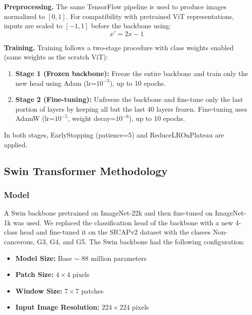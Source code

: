 \documentclass[conference]{IEEEtran}
\begin{document}
\textbf{Preprocessing.}
The same TensorFlow pipeline is used to produce images normalized to $[0,1]$. For compatibility with pretrained ViT representations, inputs are scaled to $[-1,1]$ before the backbone using:
\[
x' = 2x - 1
\]

\textbf{Training.}
Training follows a two-stage procedure with class weights enabled (same weights as the scratch ViT):
\begin{enumerate}
    \item \textbf{Stage 1 (Frozen backbone):} Freeze the entire backbone and train only the new head using Adam (lr=$10^{-3}$), up to 10 epochs.
    \item \textbf{Stage 2 (Fine-tuning):} Unfreeze the backbone and fine-tune only the last portion of layers by keeping all but the last 40 layers frozen. Fine-tuning uses AdamW (lr=$10^{-5}$, weight decay=$10^{-6}$), up to 10 epochs.
\end{enumerate}
In both stages, EarlyStopping (patience=5) and ReduceLROnPlateau are applied.


\subsection{\textbf{Swin Transformer Methodology}}
\subsubsection{\textbf{Model}}
A Swin backbone pretrained on ImageNet-22k and then fine-tuned on ImageNet-1k was used. We replaced the classification head of the backbone with a new 4-class head and fine-tuned it on the SICAPv2 dataset with the classes Non-cancerous, G3, G4, and G5. The Swin backbone had the following configuration:
\begin{itemize}
    \item \textbf{Model Size:} Base $\sim$ 88 million parameters
    \item \textbf{Patch Size:} $4\times 4$ pixels
    \item \textbf{Window Size:} $7\times 7$ patches
    \item \textbf{Input Image Resolution:} $224\times 224$ pixels
\end{itemize}
\end{document}
